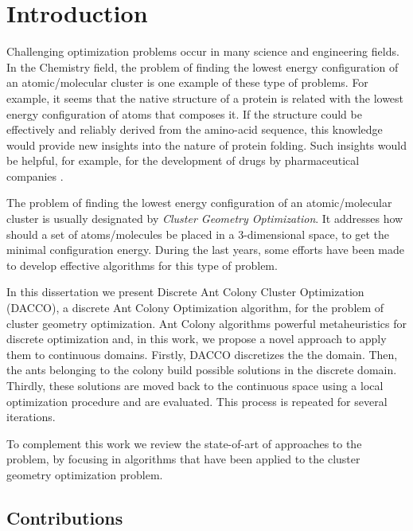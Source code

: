 \chapter{Introduction}

Challenging optimization problems occur in many science and engineering fields. In the Chemistry field, the problem of finding the lowest energy configuration of an atomic/molecular cluster is one example of these type of problems. For example, it seems that the native structure of a protein is related with the lowest energy configuration of atoms that composes it. If the structure could be effectively and reliably derived from the amino-acid sequence, this knowledge would provide new insights into the nature of protein folding. Such insights would be helpful, for example, for the development of drugs by pharmaceutical companies \cite{wales97}.

The problem of finding the lowest energy configuration of an atomic/molecular cluster is usually designated by \emph{Cluster Geometry Optimization}. It addresses how should a set of atoms/molecules be placed in a 3-dimensional space, to get the minimal configuration energy. During the last years, some efforts have been made to develop effective algorithms for this type of problem.

In this dissertation we present Discrete Ant Colony Cluster Optimization (DACCO), a discrete Ant Colony Optimization algorithm, for the problem of cluster geometry optimization. Ant Colony algorithms powerful metaheuristics for discrete optimization and, in this work, we propose a novel approach to apply them to continuous domains. Firstly, DACCO discretizes the the domain. Then, the ants belonging to the colony build possible solutions in the discrete domain. Thirdly, these solutions are moved back to the continuous space using a local optimization procedure and are evaluated. This process is repeated for several iterations.

To complement this work we review the state-of-art of approaches to the problem, by focusing in algorithms that have been applied to the cluster geometry optimization problem.


\section{Contributions}

